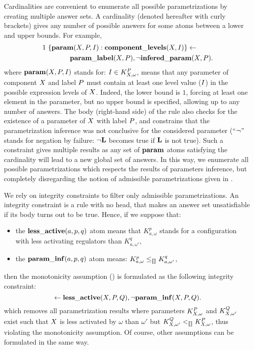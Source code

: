 Cardinalities are convenient to enumerate all possible parametrizations by creating multiple answer sets.
A cardinality (denoted hereafter with curly brackets) gives any number of possible answers for some atoms between a lower and upper bounds.
For example,
\begin{align*}
  & 1\ \{ \mathbf{param}(X, P, I) : \mathbf{component\_levels}(X, I) \} \leftarrow \\
  & \qquad\qquad \mathbf{param\_label}(X, P), \neg \mathbf{infered\_param}(X, P).
\end{align*}
where $\mathbf{param}(X, P, I)$ stands for: $I \in K^P_{X,\omega}$,
means that any parameter of component $X$ and label $P$ must contain at least one level value ($I$) in the possible expression levels of $X$.
Indeed, the lower bound is $1$, forcing at least one element in the parameter, but no upper bound is specified, allowing up to any number of answers.
The body (right-hand side) of the rule also checks for the existence of a parameter of $X$ with label $P$,
and constrains that the parametrization inference was not conclusive for the considered parameter (“$\neg$” stands for negation by failure: $\neg \mathbf{L}$ becomes true if $\mathbf{L}$ is not true).
Such a constraint gives multiple results as any set of $\mathbf{param}$ atoms satisfying the cardinality will lead to a new global set of answers.
In this way, we enumerate all possible parametrizations which respects the results of parameters inference,
but completely disregarding the notion of admissible parametrizations given in .

We rely on integrity constraints to filter only admissible parametrizations.
An integrity constraint is a rule with no head, that makes an answer set unsatisfiable if its body turns out to be true.
Hence, if we suppose that:
\begin{itemize}
  \item the $\mathbf{less\_active}(a, p, q)$ atom means that $K^p_{a,\omega}$ stands for a configuration with less activating regulators than $K^q_{a,\omega'}$, %
  \item the $\mathbf{param\_inf}(a, p, q)$ atom means: $K^p_{a,\omega} \leq_{\llbracket\rrbracket} K^q_{a,\omega'}$,
\end{itemize}
then the monotonicity assumption () is formulated as the following integrity constraint:
$$\leftarrow \mathbf{less\_active}(X, P, Q), \neg \mathbf{param\_inf}(X, P, Q).$$
which removes all parametrization results where parameters $K^P_{X,\omega}$ and $K^Q_{X,\omega'}$ exist such that $X$ is less activated by $\omega$ than $\omega'$ %
but $K^Q_{X,\omega'} <_{\llbracket\rrbracket} K^P_{X,\omega}$,
thus violating the monotonicity assumption.
Of course, other assumptions can be formulated in the same way.

